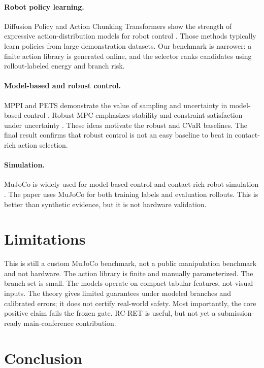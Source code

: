 \documentclass{article}
\newcommand{\method}{RC-RET}
\begin{document}
\paragraph{Robot policy learning.}
Diffusion Policy and Action Chunking Transformers show the strength of expressive action-distribution models for robot control \citep{chi2023diffusion,zhao2023learning}.  Those methods typically learn policies from large demonstration datasets.  Our benchmark is narrower: a finite action library is generated online, and the selector ranks candidates using rollout-labeled energy and branch risk.

\paragraph{Model-based and robust control.}
MPPI and PETS demonstrate the value of sampling and uncertainty in model-based control \citep{williams2017mppi,chua2018pets}.  Robust MPC emphasizes stability and constraint satisfaction under uncertainty \citep{mayne2000constrained}.  These ideas motivate the robust and CVaR baselines.  The final result confirms that robust control is not an easy baseline to beat in contact-rich action selection.

\paragraph{Simulation.}
MuJoCo is widely used for model-based control and contact-rich robot simulation \citep{todorov2012mujoco}.  The paper uses MuJoCo for both training labels and evaluation rollouts.  This is better than synthetic evidence, but it is not hardware validation.

\section{Limitations}

This is still a custom MuJoCo benchmark, not a public manipulation benchmark and not hardware.  The action library is finite and manually parameterized.  The branch set is small.  The models operate on compact tabular features, not visual inputs.  The theory gives limited guarantees under modeled branches and calibrated errors; it does not certify real-world safety.  Most importantly, the core positive claim fails the frozen gate.  \method{} is useful, but not yet a submission-ready main-conference contribution.

\section{Conclusion}
\end{document}
